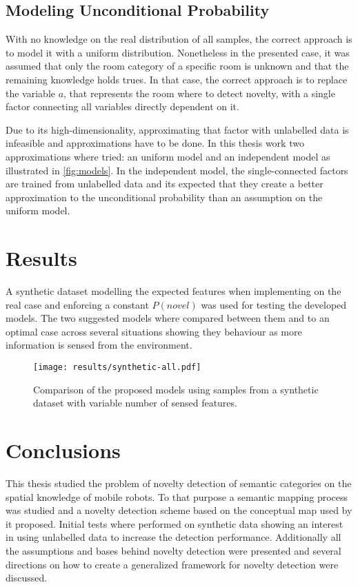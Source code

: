 \documentclass[9pt,a4paper]{extarticle}
\begin{document}
\begin{multicols}{2}
\subsection{Modeling Unconditional Probability}
With no knowledge on the real distribution of all samples, the correct approach is to model it
with a uniform distribution. Nonetheless in the presented case, it was assumed that only the room
category of a specific room is unknown and that the remaining knowledge holds trues.
In that case, the correct approach is to replace the variable $a$, that represents the room where to
detect novelty, with a single factor connecting all variables directly dependent on it. 

Due to its high-dimensionality, approximating that factor with unlabelled data is infeasible and
approximations have to be done. In this thesis work two approximations where tried: an uniform model
and an independent model as illustrated in \autoref{fig:models}. In the independent model, the
single\hyp{}connected factors are trained from unlabelled data and its expected that they create a better
approximation to the unconditional probability than an assumption on the uniform model.

\section{Results}
A synthetic dataset modelling the expected features when implementing on the real case and enforcing
a constant $P(novel)$ was used for testing the developed models.
The two suggested models where compared between them and to an optimal case across several situations
showing they behaviour as more information is sensed from the environment.

\begin{figure}[H]
\centering
\texttt{[image: results/synthetic-all.pdf]}
\caption{\label{fig:results}Comparison of the proposed models using samples from a synthetic dataset
         with variable number of sensed features.}
\end{figure}

\section{Conclusions}
This thesis studied the problem of novelty detection of semantic categories on the spatial knowledge
of mobile robots. To that purpose a semantic mapping process~\cite{pronobis2011semmap} was studied and
a novelty detection scheme based on the conceptual map used by it proposed.
Initial tests where performed on synthetic data showing an interest in using unlabelled data to
increase the detection performance.
Additionally all the assumptions and bases behind novelty detection were presented and several
directions on how to create a generalized framework for novelty detection were discussed.





\end{multicols}
\end{document}
